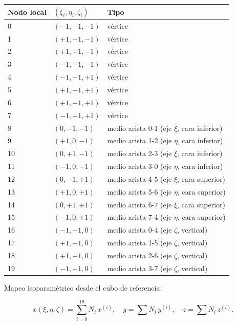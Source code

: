 \documentclass[11pt,letterpaper,oneside]{report}
\begin{document}
\begin{center}
\begin{tabularx}{\textwidth}{YYY}
\hline
\textbf{Nodo local} & \textbf{$(\xi_i, \eta_i, \zeta_i)$} & \textbf{Tipo} \\
 & $(-1, -1, -1)$ & vértice \\
1 & $(+1, -1, -1)$ & vértice \\
2 & $(+1, +1, -1)$ & vértice \\
3 & $(-1, +1, -1)$ & vértice \\
4 & $(-1, -1, +1)$ & vértice \\
5 & $(+1, -1, +1)$ & vértice \\
6 & $(+1, +1, +1)$ & vértice \\
7 & $(-1, +1, +1)$ & vértice \\
8 & $(0, -1, -1)$ & medio arista 0-1 (eje \ensuremath{\xi}, cara inferior) \\
9 & $(+1, 0, -1)$ & medio arista 1-2 (eje \ensuremath{\eta}, cara inferior) \\
10 & $(0, +1, -1)$ & medio arista 2-3 (eje \ensuremath{\xi}, cara inferior) \\
11 & $(-1, 0, -1)$ & medio arista 3-0 (eje \ensuremath{\eta}, cara inferior) \\
12 & $(0, -1, +1)$ & medio arista 4-5 (eje \ensuremath{\xi}, cara superior) \\
13 & $(+1, 0, +1)$ & medio arista 5-6 (eje \ensuremath{\eta}, cara superior) \\
14 & $(0, +1, +1)$ & medio arista 6-7 (eje \ensuremath{\xi}, cara superior) \\
15 & $(-1, 0, +1)$ & medio arista 7-4 (eje \ensuremath{\eta}, cara superior) \\
16 & $(-1, -1, 0)$ & medio arista 0-4 (eje \ensuremath{\zeta}, vertical) \\
17 & $(+1, -1, 0)$ & medio arista 1-5 (eje \ensuremath{\zeta}, vertical) \\
18 & $(+1, +1, 0)$ & medio arista 2-6 (eje \ensuremath{\zeta}, vertical) \\
19 & $(-1, +1, 0)$ & medio arista 3-7 (eje \ensuremath{\zeta}, vertical) \\
\hline
\end{tabularx}
\end{center}
Mapeo isoparamétrico desde el cubo de referencia:

\[
x(\xi, \eta, \zeta) = \sum_{i=0}^{19} N_i\, x^{(i)},\quad y = \sum N_i\, y^{(i)},\quad z = \sum N_i\, z^{(i)}.
\]
\end{document}
